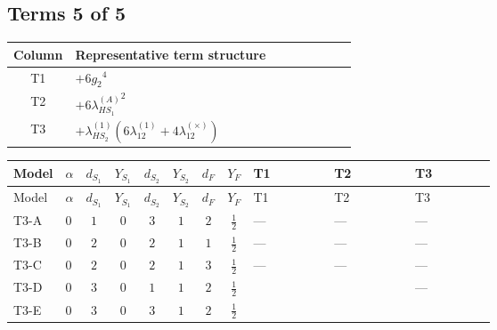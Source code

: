 \documentclass[8pt]{article}
\begin{document}
\begin{landscape}
\subsection*{Terms 5 of 5}
\begin{center}
\begin{tabular}{@{}c >{\raggedright\arraybackslash}p{0.82\linewidth}@{}}
\toprule
Column & Representative term structure \\
\midrule
T1 & \(\displaystyle +6 {g_2}^4\) \\
\midrule
T2 & \(\displaystyle +6 {\lambda_{HS_1}^{(A)}}^2\) \\
\midrule
T3 & \(\displaystyle +{\lambda_{HS_2}^{(1)}} (6 {\lambda_{12}^{(1)}}+4 {\lambda_{12}^{(\times)}})\) \\
\midrule
\bottomrule
\end{tabular}
\end{center}
\smallskip
\tiny
\begin{longtable}{@{}llcccccc >{\raggedright\arraybackslash}p{0.21\linewidth} >{\raggedright\arraybackslash}p{0.21\linewidth} >{\raggedright\arraybackslash}p{0.21\linewidth}@{}}
\toprule
Model & $\alpha$ & $d_{S_1}$ & $Y_{S_1}$ & $d_{S_2}$ & $Y_{S_2}$ & $d_F$ & $Y_F$ & T1 & T2 & T3 \\
\midrule
\endfirsthead
\toprule
Model & $\alpha$ & $d_{S_1}$ & $Y_{S_1}$ & $d_{S_2}$ & $Y_{S_2}$ & $d_F$ & $Y_F$ & T1 & T2 & T3 \\
\midrule
\endhead
T3-A & $0$ & $1$ & $0$ & $3$ & $1$ & $2$ & $\frac{1}{2}$ & --- & --- & --- \\
\midrule
T3-B & $0$ & $2$ & $0$ & $2$ & $1$ & $1$ & $\frac{1}{2}$ & --- & --- & --- \\
\midrule
T3-C & $0$ & $2$ & $0$ & $2$ & $1$ & $3$ & $\frac{1}{2}$ & --- & --- & --- \\
\midrule
T3-D & $0$ & $3$ & $0$ & $1$ & $1$ & $2$ & $\frac{1}{2}$ & \scriptsize\adjustbox{max width=\linewidth}{$\begin{gathered} +6 {g_2}^4\end{gathered}$} & \scriptsize\adjustbox{max width=\linewidth}{$\begin{gathered} +6 {\lambda_{HS_1}^{(A)}}^2\end{gathered}$} & --- \\
\midrule
T3-E & $0$ & $3$ & $0$ & $3$ & $1$ & $2$ & $\frac{1}{2}$ & \scriptsize\adjustbox{max width=\linewidth}{$\begin{gathered} +6 {g_2}^4\end{gathered}$} & \scriptsize\adjustbox{max width=\linewidth}{$\begin{gathered} +6 {\lambda_{HS_1}^{(A)}}^2\end{gathered}$} & \scriptsize\adjustbox{max width=\linewidth}{$\begin{gathered} +{\lambda_{HS_2}^{(1)}} (6 {\lambda_{12}^{(1)}}+4 {\lambda_{12}^{(\times)}})\end{gathered}$} \\
\midrule
\bottomrule
\end{longtable}
\clearpage

\end{landscape}
\end{document}
